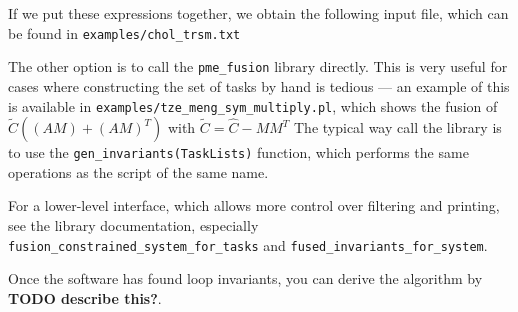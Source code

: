 \documentclass[12pt,letterpaper]{article}
\begin{document}
If we put these expressions together, we obtain the following input file, which can be found in \texttt{examples/chol\_trsm.txt}
{\small }

The other option is to call the \texttt{pme\_fusion} library directly.
This is very useful for cases where constructing the set of tasks by hand is tedious --- an example of this is available in \texttt{examples/tze\_meng\_sym\_multiply.pl}, which shows the fusion of $\widetilde{C} ((AM) + (AM)^T)$ with $\widetilde{C} = \hat{C} - MM^T$
The typical way call the library is to use the \texttt{gen\_invariants(TaskLists)} function, which performs the same operations as the script of the same name.

For a lower-level interface, which allows more control over filtering and printing, see the library documentation, especially \texttt{fusion\_constrained\_system\_for\_tasks} and \texttt{fused\_invariants\_for\_system}.

Once the software has found loop invariants, you can derive the algorithm by \textbf{TODO describe this?}.
\end{document}
